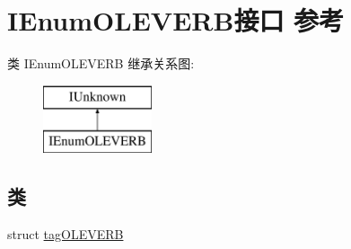 \hypertarget{interface_i_enum_o_l_e_v_e_r_b}{}\section{I\+Enum\+O\+L\+E\+V\+E\+R\+B接口 参考}
\label{interface_i_enum_o_l_e_v_e_r_b}
类 I\+Enum\+O\+L\+E\+V\+E\+RB 继承关系图\+:\begin{figure}[H]
\begin{center}
\leavevmode
\includegraphics[height=2.000000cm]{interface_i_enum_o_l_e_v_e_r_b}
\end{center}
\end{figure}
\subsection*{类}
\begin{DoxyCompactItemize}
\item 
struct \hyperlink{struct_i_enum_o_l_e_v_e_r_b_1_1tag_o_l_e_v_e_r_b}{tag\+O\+L\+E\+V\+E\+RB}
\end{DoxyCompactItemize}

